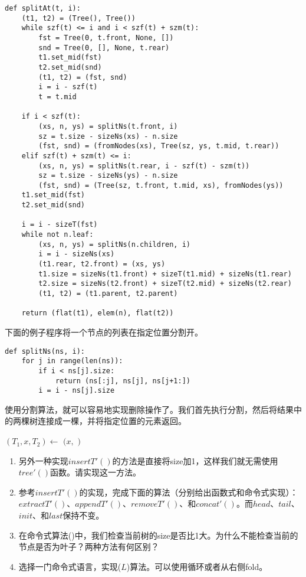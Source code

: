 \documentclass[UTF8]{article}
\begin{document}
\lstset{language=Python}
\begin{lstlisting}
def splitAt(t, i):
    (t1, t2) = (Tree(), Tree())
    while szf(t) <= i and i < szf(t) + szm(t):
        fst = Tree(0, t.front, None, [])
        snd = Tree(0, [], None, t.rear)
        t1.set_mid(fst)
        t2.set_mid(snd)
        (t1, t2) = (fst, snd)
        i = i - szf(t)
        t = t.mid

    if i < szf(t):
        (xs, n, ys) = splitNs(t.front, i)
        sz = t.size - sizeNs(xs) - n.size
        (fst, snd) = (fromNodes(xs), Tree(sz, ys, t.mid, t.rear))
    elif szf(t) + szm(t) <= i:
        (xs, n, ys) = splitNs(t.rear, i - szf(t) - szm(t))
        sz = t.size - sizeNs(ys) - n.size
        (fst, snd) = (Tree(sz, t.front, t.mid, xs), fromNodes(ys))
    t1.set_mid(fst)
    t2.set_mid(snd)

    i = i - sizeT(fst)
    while not n.leaf:
        (xs, n, ys) = splitNs(n.children, i)
        i = i - sizeNs(xs)
        (t1.rear, t2.front) = (xs, ys)
        t1.size = sizeNs(t1.front) + sizeT(t1.mid) + sizeNs(t1.rear)
        t2.size = sizeNs(t2.front) + sizeT(t2.mid) + sizeNs(t2.rear)
        (t1, t2) = (t1.parent, t2.parent)

    return (flat(t1), elem(n), flat(t2))
\end{lstlisting}

下面的例子程序将一个节点的列表在指定位置分割开。

\begin{lstlisting}
def splitNs(ns, i):
    for j in range(len(ns)):
        if i < ns[j].size:
            return (ns[:j], ns[j], ns[j+1:])
        i = i - ns[j].size
\end{lstlisting}

使用分割算法，就可以容易地实现删除操作了。我们首先执行分割，然后将结果中的两棵树连接成一棵，并将指定位置的元素返回。

\begin{algorithmic}
  \State $(T_1, x, T_2) \gets$ 
  \State \Return $(x, $  $)$
\EndFunction
\end{algorithmic}

\begin{Exercise}
\begin{enumerate}
\item 另外一种实现$insertT'()$的方法是直接将size加1，这样我们就无需使用$tree'()$函数。请实现这一方法。

\item 参考$insertT'()$的实现，完成下面的算法（分别给出函数式和命令式实现）：$extractT'()$、$appendT'()$、$removeT'()$、和$concat'()$。而$head$、$tail$、$init$、和$last$保持不变。

\item 在命令式算法()中，我们检查当前树的size是否比1大。为什么不能检查当前的节点是否为叶子？两种方法有何区别？

\item 选择一门命令式语言，实现($L$)算法。可以使用循环或者从右侧fold。
\end{enumerate}
\end{Exercise}
\end{document}
